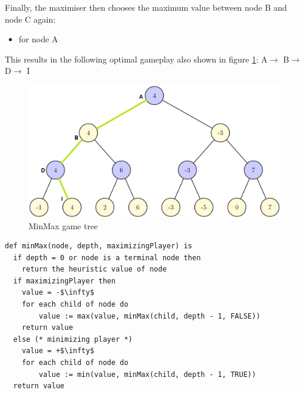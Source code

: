 \documentclass[conference,pdf,table,xcdraw, utf8]{IEEEtran}
\begin{document}
Finally, the maximiser then chooses the maximum value between node B and node C again:

\begin{itemize}
    \item for node A 
\end{itemize}

This results in the following optimal gameplay also shown in figure \ref{figure:tree_final.PNG}:
A$\rightarrow$ B$\rightarrow$ D$\rightarrow$ I

\begin{figure}[H]
    \centering
    \includegraphics[scale=0.39]{images/tree_final.png}
    \caption{MinMax game tree}
    \label{figure:tree_final.PNG}
\end{figure}
\vspace{\fill}

\begin{lstlisting}[linewidth=\columnwidth,breaklines=true,mathescape=true,
caption=MinMax Pseudocode]
def minMax(node, depth, maximizingPlayer) is
  if depth = 0 or node is a terminal node then
    return the heuristic value of node
  if maximizingPlayer then
    value = -$\infty$
    for each child of node do
        value := max(value, minMax(child, depth - 1, FALSE))
    return value
  else (* minimizing player *)
    value = +$\infty$
    for each child of node do
        value := min(value, minMax(child, depth - 1, TRUE))
  return value
\end{lstlisting}
\end{document}
